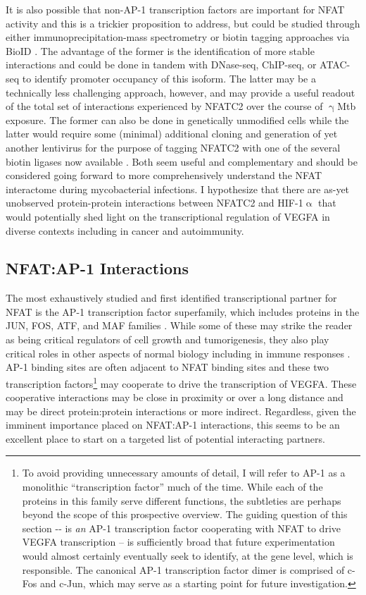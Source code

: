 It is also possible that non\hyp{}AP\hyp{}1 transcription factors are important for NFAT activity and this is a trickier proposition to address, but could be studied through either immunoprecipitation\hyp{}mass spectrometry or biotin tagging approaches via BioID \citep{Roux2012}. The advantage of the former is the identification of more stable interactions and could be done in tandem with DNase\hyp{}seq, ChIP\hyp{}seq, or ATAC\hyp{}seq to identify promoter occupancy of this isoform. The latter may be a technically less challenging approach, however, and may provide a useful readout of the total set of interactions experienced by NFATC2 over the course of $\upgamma$Mtb exposure. The former can also be done in genetically unmodified cells while the latter would require some (minimal) additional cloning and generation of yet another lentivirus for the purpose of tagging NFATC2 with one of the several biotin ligases now available \citep{Cho2020}. Both seem useful and complementary and should be considered going forward to more comprehensively understand the NFAT interactome during mycobacterial infections. I hypothesize that there are as\hyp{}yet unobserved protein\hyp{}protein interactions between NFATC2 and HIF\hyp{}1$\upalpha$ that would potentially shed light on the transcriptional regulation of VEGFA in diverse contexts including in cancer and autoimmunity. 

\subsection{NFAT:AP\hyp{}1 Interactions}\label{nfatap1}

The most exhaustively studied and first identified transcriptional partner for NFAT is the AP\hyp{}1 transcription factor superfamily, which includes proteins in the JUN, FOS, ATF, and MAF families \citep{Boise1993}. While some of these may strike the reader as being critical regulators of cell growth and tumorigenesis, they also play critical roles in other aspects of normal biology including in immune responses \citep{Macian2001, Eferl2003}. AP\hyp{}1 binding sites are often adjacent to NFAT binding sites and these two transcription factors\footnote{To avoid providing unnecessary amounts of detail, I will refer to AP\hyp{}1 as a monolithic ``transcription factor'' much of the time. While each of the proteins in this family serve different functions, the subtleties are perhaps beyond the scope of this prospective overview. The guiding question of this section \hyp{}\hyp{} is \textit{an} AP\hyp{}1 transcription factor cooperating with NFAT to drive VEGFA transcription -- is sufficiently broad that future experimentation would almost certainly eventually seek to identify, at the gene level, which is responsible. The canonical AP-1 transcription factor dimer is comprised of c-Fos and c-Jun, which may serve as a starting point for future investigation.} may cooperate to drive the transcription of VEGFA. These cooperative interactions may be close in proximity or over a long distance and may be direct protein:protein interactions or more indirect. Regardless, given the imminent importance placed on NFAT:AP\hyp{}1 interactions, this seems to be an excellent place to start on a targeted list of potential interacting partners.

